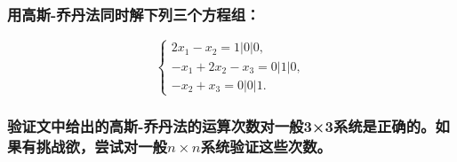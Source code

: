 \subsubsection{用高斯-乔丹法同时解下列三个方程组：}
\[
\begin{cases}
	2x_1 - x_2 = 1 \big| 0 \big| 0, \\
	-x_1 + 2x_2 - x_3 = 0 \big| 1 \big| 0, \\
	-x_2 + x_3 = 0 \big| 0 \big| 1.
\end{cases}
\]

\subsubsection{验证文中给出的高斯-乔丹法的运算次数对一般3×3系统是正确的。如果有挑战欲，尝试对一般\( n \times n \)系统验证这些次数。}




